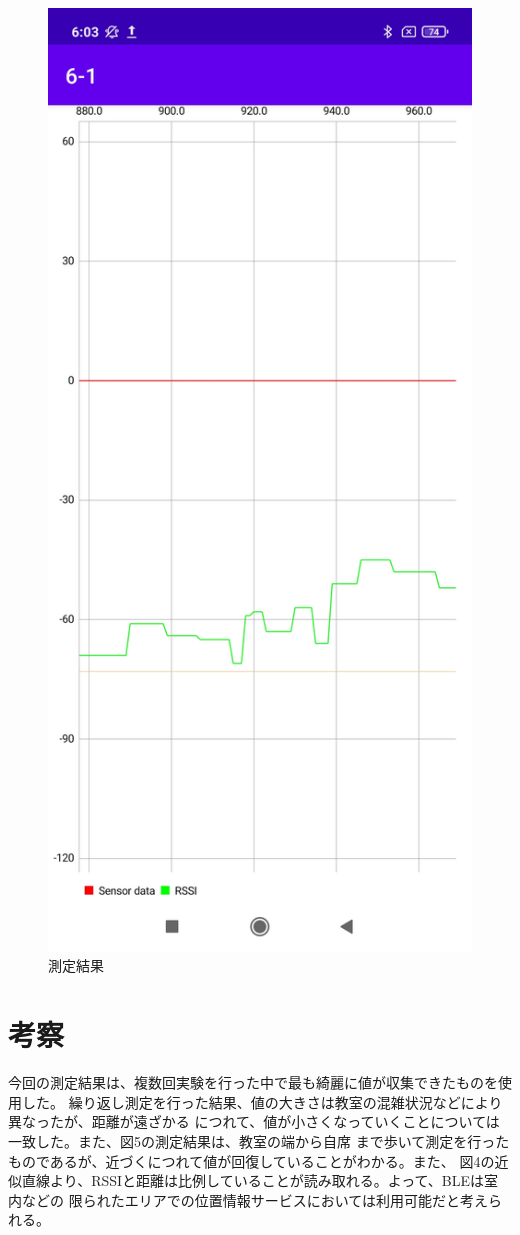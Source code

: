 \documentclass[dvipdfmx,autodetect-engine,titlepage]{jsarticle}
\begin{document}
\begin{figure}[h]
  \centering
  \includegraphics[scale=0.1]{pic5.jpg}
  \caption{測定結果}
\end{figure}

\section{考察}
今回の測定結果は、複数回実験を行った中で最も綺麗に値が収集できたものを使用した。
繰り返し測定を行った結果、値の大きさは教室の混雑状況などにより異なったが、距離が遠ざかる
につれて、値が小さくなっていくことについては一致した。また、図5の測定結果は、教室の端から自席
まで歩いて測定を行ったものであるが、近づくにつれて値が回復していることがわかる。また、
図4の近似直線より、RSSIと距離は比例していることが読み取れる。よって、BLEは室内などの
限られたエリアでの位置情報サービスにおいては利用可能だと考えられる。
\end{document}
